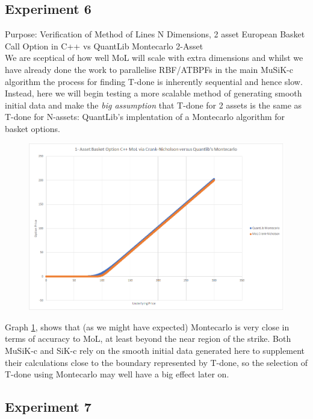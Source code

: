 \documentclass[a4paper]{amsart}
\begin{document}
\subsection{Experiment 6}\label{cppExp6}

Purpose: Verification of Method of Lines N Dimensions, 2 asset European Basket Call Option in C++ vs QuantLib Montecarlo 2-Asset\\

We are sceptical of how well MoL will scale with extra dimensions and whilst we have already done the work to parallelise RBF/ATBPFs in the main MuSiK-c algorithm the process for finding T-done is inherently sequential and hence slow. Instead, here we will begin testing a more scalable method of generating smooth initial data and make the \emph{big assumption} that T-done for 2 assets is the same as T-done for N-assets: QuantLib's\cite{ql} implentation of a Montecarlo algorithm for basket options.

\begin{figure}[h]
\centering
\includegraphics[scale=0.3]{cppExp6-chart.png}
\caption {}
\label {fig:cppExp6}
\end{figure}

Graph \ref{fig:cppExp6}, shows that (as we might have expected) Montecarlo is very close in terms of accuracy to MoL, at least beyond the near region of the strike. Both MuSiK-c and SiK-c rely on the smooth initial data generated here to supplement their calculations close to the boundary represented by T-done, so the selection of T-done using Montecarlo may well have a big effect later on.

\subsection{Experiment 7}\label{cppExp7}
\end{document}
